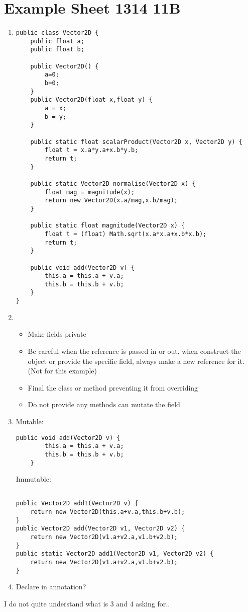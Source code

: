 \documentclass[10pt,twoside,a4paper]{article}
\begin{document}
\section{Example Sheet 1314 11B}
\begin{enumerate}

\item
\begin{lstlisting}
public class Vector2D {
	public float a;
	public float b;
	
	public Vector2D() {
		a=0;
		b=0;
	}
	public Vector2D(float x,float y) {
		a = x;
		b = y;
	}

	public static float scalarProduct(Vector2D x, Vector2D y) {
		float t = x.a*y.a+x.b*y.b;
		return t;
	}
	
	public static Vector2D normalise(Vector2D x) {
		float mag = magnitude(x);
		return new Vector2D(x.a/mag,x.b/mag);
	}
	
	public static float magnitude(Vector2D x) {
		float t = (float) Math.sqrt(x.a*x.a+x.b*x.b);
		return t;
	}
	
	public void add(Vector2D v) {
		this.a = this.a + v.a;
		this.b = this.b + v.b;
	}
}
\end{lstlisting}
\item
\begin{itemize}
\item Make fields private
\item Be careful when the reference is passed in or out, when construct the object or provide the specific field, always make a new reference for it. (Not for this example)
\item Final the class or method preventing it from overriding
\item Do not provide any methods can mutate the field
\end{itemize}
\item
Mutable:\\
\begin{lstlisting}
public void add(Vector2D v) {
		this.a = this.a + v.a;
		this.b = this.b + v.b;
	}
\end{lstlisting}
Immutable:\\
\begin{lstlisting}	

public Vector2D add1(Vector2D v) {
	return new Vector2D(this.a+v.a,this.b+v.b);
}
public Vector2D add(Vector2D v1, Vector2D v2) {
	return new Vector2D(v1.a+v2.a,v1.b+v2.b);
}
public static Vector2D add1(Vector2D v1, Vector2D v2) {
	return new Vector2D(v1.a+v2.a,v1.b+v2.b);
}
\end{lstlisting}
\item
Declare in annotation?
\end{enumerate}
I do not quite understand what is 3 and 4 asking for..
\end{document}
